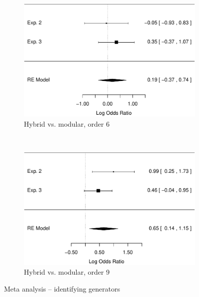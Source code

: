 \documentclass[man,10pt]{apa6}
\begin{document}
\begin{figure}
\begin{subfigure}[c]{0.4\textwidth}
\includegraphics[width=\textwidth]{figures/meta/question_typegenerator_true_6_conditionhybrid.pdf}
\caption{Hybrid vs. modular, order 6}
\end{subfigure}
~
\begin{subfigure}[c]{0.4\textwidth}
\centering
\includegraphics[width=\textwidth]{figures/meta/question_typegenerator_true_9_conditionhybrid.pdf}
\caption{Hybrid vs. modular, order 9}
\end{subfigure}
\caption{Meta analysis -- identifying generators}
\label{meta_genT}
\end{figure}\noindent 
\end{document}
